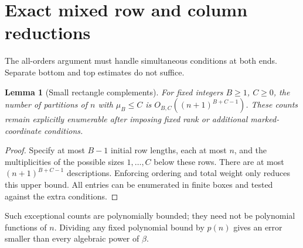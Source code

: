 \documentclass[11pt,letterpaper]{article}
\numberwithin{equation}{section}
\newtheorem{lemma}[theorem]{Lemma}
\theoremstyle{remark}\newtheorem{remark}[theorem]{Remark}
\begin{document}
\section{Exact mixed row and column reductions}\label{dgp:sub:sec:mixed}
The all-orders argument must handle simultaneous conditions at both
ends. Separate bottom and top estimates do not suffice.

\begin{lemma}[Small rectangle complements]\label{dgp:sub:lem:rectangle}
For fixed integers $B\geq1$, $C\geq0$, the number of partitions of
$n$ with $\mu_B\leq C$ is
$O_{B,C}((n+1)^{B+C-1})$. These counts remain explicitly enumerable
after imposing fixed rank or additional marked-coordinate conditions.
\end{lemma}
\begin{proof}
Specify at most $B-1$ initial row lengths, each at most $n$, and
the multiplicities of the possible sizes $1,\ldots,C$ below these
rows. There are at most $(n+1)^{B+C-1}$ descriptions. Enforcing
ordering and total weight only reduces this upper bound. All entries
can be enumerated in finite boxes and tested against the extra
conditions.
\end{proof}
Such exceptional counts are polynomially bounded; they need not be
polynomial functions of $n$. Dividing any fixed polynomial bound by
$p(n)$ gives an error smaller than every algebraic power of $\beta$.
\end{document}
